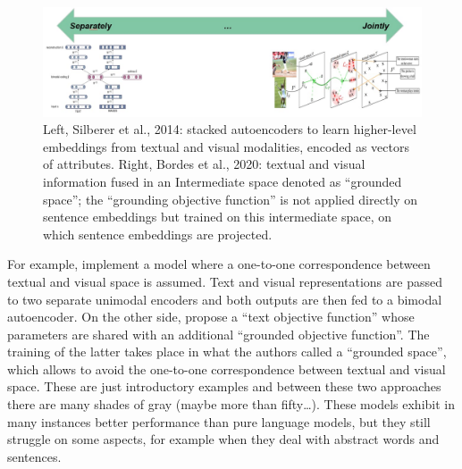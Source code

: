 \documentclass[
]{krantz}
\begin{document}
\begin{figure}

{\centering \includegraphics[width=1\linewidth]{figures/02-chapter2/Img_Ch_Intro} 

}

\caption{Left, Silberer et al., 2014: stacked autoencoders to learn higher-level embeddings from textual and visual modalities, encoded as vectors of attributes. Right, Bordes et al., 2020: textual and visual information fused in an Intermediate space denoted as “grounded space”; the “grounding objective function” is not applied directly on sentence embeddings but trained on this intermediate space, on which sentence embeddings are projected.}\label{fig:unnamed-chunk-1}
\end{figure}

For example, \citet{silberer2012grounded} implement a model where a one-to-one correspondence between textual and visual space is assumed.
Text and visual representations are passed to two separate unimodal encoders and both outputs are then fed to a bimodal autoencoder.
On the other side, \citet{bordes2020incorporating} propose a ``text objective function'' whose parameters are shared with an additional ``grounded objective function''.
The training of the latter takes place in what the authors called a ``grounded space'', which allows to avoid the one-to-one correspondence between textual and visual space.
These are just introductory examples and between these two approaches there are many shades of gray (maybe more than fifty\ldots).
These models exhibit in many instances better performance than pure language models, but they still struggle on some aspects, for example when they deal with abstract words and sentences.
\end{document}

